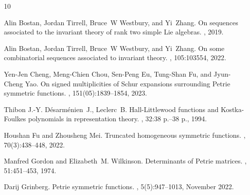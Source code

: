 \documentclass[pdflatex,sn-mathphys-num]{sn-jnl}%
\theoremstyle{thmstyleone}%
\theoremstyle{thmstyletwo}%
\theoremstyle{thmstylethree}%
\numberwithin{equation}{section}
\begin{document}
\backmatter


\begin{thebibliography}{10}

Alin Bostan, Jordan Tirrell, Bruce~W Westbury, and Yi~Zhang.
\newblock On sequences associated to the invariant theory of rank two simple
  Lie algebras.
, 2019.

Alin Bostan, Jordan Tirrell, Bruce~W Westbury, and Yi~Zhang.
\newblock On some combinatorial sequences associated to invariant theory.
, 105:103554, 2022.

Yen-Jen Cheng, Meng-Chien Chou, Sen-Peng Eu, Tung-Shan Fu, and Jyun-Cheng Yao.
\newblock On signed multiplicities of Schur expansions surrounding Petrie
  symmetric functions.
,
  151(05):1839--1854, 2023.

Thibon J.-Y. Désarménien~J., Leclerc~B.
\newblock Hall-Littlewood functions and Kostka-Foulkes polynomials in
  representation theory.
,
  32:38 p.--38 p., 1994.

Houshan Fu and Zhousheng Mei.
\newblock Truncated homogeneous symmetric functions.
, 70(3):438--448, 2022.

Manfred Gordon and Elizabeth~M. Wilkinson.
\newblock Determinants of Petrie matrices.
, 51:451--453, 1974.

Darij Grinberg.
\newblock Petrie symmetric functions.
, 5(5):947–1013, November 2022.


\end{thebibliography}
\end{document}
